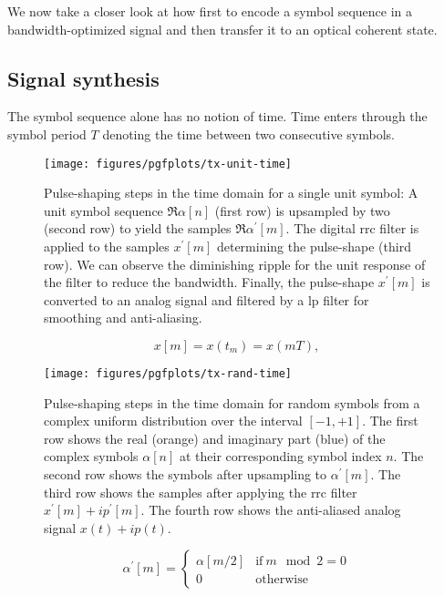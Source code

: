 We now take a closer look at how first to encode a symbol sequence in a bandwidth-optimized signal and then transfer it to an optical coherent state.

\subsection{Signal synthesis}

The symbol sequence alone has no notion of time.
Time enters through the symbol period $T$ denoting the time between two consecutive symbols.

\begin{figure}[htb]
	\centering
	\texttt{[image: figures/pgfplots/tx-unit-time]}
	\caption{Pulse-shaping steps in the time domain for a single unit symbol: A unit symbol sequence $\Re\alpha[n]$ (first row) is upsampled by two (second row) to yield the samples $\Re\alpha^\prime[m]$. The digital \gls{rrc} filter is applied to the samples $x^\prime[m]$ determining the pulse-shape (third row). We can observe the diminishing ripple for the unit response of the filter to reduce the bandwidth. Finally, the pulse-shape $x^\prime[m]$ is converted to an analog signal and filtered by a \gls{lp} filter for smoothing and anti-aliasing.}\label{fig:pulse_shaping_unit_time}
\end{figure}

\begin{equation}
	x[m]
	=
	x(t_m)
	=
	x(mT)
	,
\end{equation}

\begin{figure}[htb]
	\centering
	\texttt{[image: figures/pgfplots/tx-rand-time]}
	\caption{Pulse-shaping steps in the time domain for random symbols from a complex uniform distribution over the interval $[-1,+1]$. The first row shows the real (orange) and imaginary part (blue) of the complex symbols $\alpha[n]$ at their corresponding symbol index $n$. The second row shows the symbols after upsampling to $\alpha^\prime[m]$. The third row shows the samples after applying the \gls{rrc} filter $x^\prime[m]+ip^\prime[m]$. The fourth row shows the anti-aliased analog signal $x(t)+ip(t)$.}\label{fig:pulse_shaping_rand_time}
\end{figure}

\begin{equation}
	\alpha^\prime[m]
	=
	\begin{cases}
		\alpha[m/2] & \text{if}\ m\mod2=0 \\
		0 & \text{otherwise}
	\end{cases}
\end{equation}


